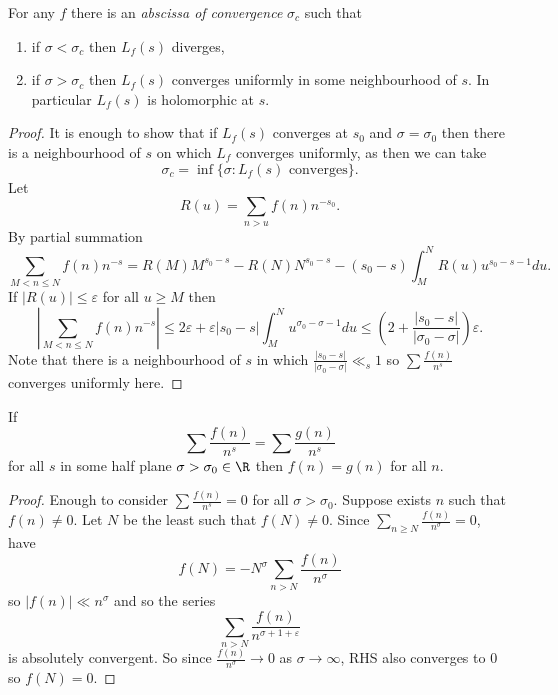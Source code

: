 \documentclass[a4paper]{article}
\begin{document}
\begin{lemma}
  For any \(f\) there is an \emph{abscissa of convergence} \(\sigma_c\) such that
  \begin{enumerate}
  \item if \(\sigma < \sigma_c\) then \(L_f(s)\) diverges,
  \item if \(\sigma > \sigma_c\) then \(L_f(s)\) converges uniformly in some neighbourhood of \(s\). In particular \(L_f(s)\) is holomorphic at \(s\).
  \end{enumerate}
\end{lemma}

\begin{proof}
  It is enough to show that if \(L_f(s)\) converges at \(s_0\) and \(\sigma = \sigma_0\) then there is a neighbourhood of \(s\) on which \(L_f\) converges uniformly, as then we can take
  \[
    \sigma_c = \inf \{\sigma: L_f(s) \text{ converges}\}.
  \]
  Let
  \[
    R(u) = \sum_{n > u} f(n) n^{-s_0}.
  \]
  By partial summation
  \[
    \sum_{M < n \leq N} f(n) n^{-s}
    = R(M) M^{s_0 - s} - R(N) N^{s_0 - s} - (s_0 - s) \int_M^N R(u) u^{s_0 - s - 1} du.
  \]
  If \(|R(u)| \leq \varepsilon\) for all \(u \geq M\) then 
  \[
    \left| \sum_{M < n \leq N} f(n) n^{-s} \right|
    \leq 2\varepsilon + \varepsilon |s_0 - s| \int_M^N u^{\sigma_0 - \sigma - 1} du
    \leq (2 + \frac{|s_0 - s|}{|\sigma_0 - \sigma|}) \varepsilon.
  \]
  Note that there is a neighbourhood of \(s\) in which \(\frac{|s_0 - s|}{|\sigma_0 - \sigma|} \ll_s 1\) so \(\sum \frac{f(n)}{n^s}\) converges uniformly here.
\end{proof}

\begin{lemma}
  If
  \[
    \sum \frac{f(n)}{n^s} = \sum \frac{g(n)}{n^s}
  \]
  for all \(s\) in some half plane \(\sigma > \sigma_0 \in \R\) then \(f(n) = g(n)\) for all \(n\).
\end{lemma}

\begin{proof}
  Enough to consider \(\sum \frac{f(n)}{n^s} = 0\) for all \(\sigma > \sigma_0\). Suppose exists \(n\) such that \(f(n) \neq 0\). Let \(N\) be the least such that \(f(N) \neq 0\). Since \(\sum_{n \geq N} \frac{f(n)}{n^\sigma} = 0\), have
  \[
    f(N) = - N^\sigma \sum_{n > N} \frac{f(n)}{n^\sigma}
  \]
  so \(|f(n)| \ll n^\sigma\) and so the series
  \[
    \sum_{n > N} \frac{f(n)}{n^{\sigma + 1 + \varepsilon}}
    \]
    is absolutely convergent. So since \(\frac{f(n)}{n^\sigma} \to 0\) as \(\sigma \to \infty\), RHS also converges to \(0\) so \(f(N) = 0\).
\end{proof}
\end{document}
